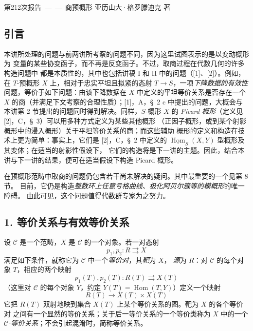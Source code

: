 \unit{第212次报告——商预概形}
%
  {亚历山大·格罗滕迪克 著}

\subsection*{引言}

本讲所处理的问题与前两讲所考察的问题不同，因为这里试图表示的是以变动概形为
变量的某些协变函子，而不再是反变函子。不过，取商过程在代数几何的许多构造问题中
都是本质性的，其中也包括讲稿 I 和 II 中的问题（[1]、[2]）。例如，在 $T$-预概形
$X$ 上，相对于忠实平坦且拟紧的态射 $T\longrightarrow S$，一项\emph{下降数据的有效性}
问题，等价于如下问题：由该下降数据在 $X$ 中定义的平坦等价关系是否存在一个
$X$ 的商（并满足下文考察的合理性质）；[1]，A，\S~2 c 中提出的问题，大概会与
本讲第 2 节提出的问题同时得到解决。同样，$S$-概形 $X$ 的
\emph{Picard 概形}（定义见 [2]，C，\S~3）可以用多种方式定义为某些其他概形
（正因子概形，或到某个射影概形中的浸入概形）关于平坦等价关系的商；而这些辅助
概形的定义和构造在技术上更为简单：事实上，它们是 [2]，C，\S~2 中定义的
$\underline{\operatorname{Hom}}_S(X,Y)$ 型概形及其变体；在适当的射影性假设下，
它们的构造将是下一讲的主题。因此，结合本讲与下一讲的结果，便可在适当假设下构造
Picard 概形。

在预概形范畴中取商的问题仍包含若干尚未解决的疑问。其中最重要的一个见第 8 节。
目前，它仍是构造\emph{整数环上任意亏格曲线、极化阿贝尔簇等的模概形}的唯一障碍。
由此可见，这个问题值得代数群专家为之努力。

\subsection*{1. 等价关系与有效等价关系}

设 $\mathcal C$ 是一个范畴，$X$ 是 $\mathcal C$ 的一个对象。若一对态射
\[
  p_1,p_2:R\rightrightarrows X
\]
满足如下条件，就称它为 $\mathcal C$ 中一个\emph{等价对}，其\emph{靶}为 $X$，
\emph{源}为 $R$：对 $\mathcal C$ 的每个对象 $T$，相应的两个映射
\[
  p_1(T),p_2(T):R(T)\rightrightarrows X(T)
\]
（这里对 $\mathcal C$ 的每个对象 $Y$，约定
$Y(T)=\operatorname{Hom}(T,Y)$）定义一个映射
\[
  R(T)\longrightarrow X(T)\times X(T)
\]
它把 $R(T)$ 双射地映到集合 $X(T)$ 上某个等价关系的图。靶为 $X$ 的各个等价对
之间有一个显然的等价关系；关于后一等价关系的一个等价类称为 $X$ 中的一个
\emph{$\mathcal C$-等价关系}；不会引起混淆时，简称等价关系。

